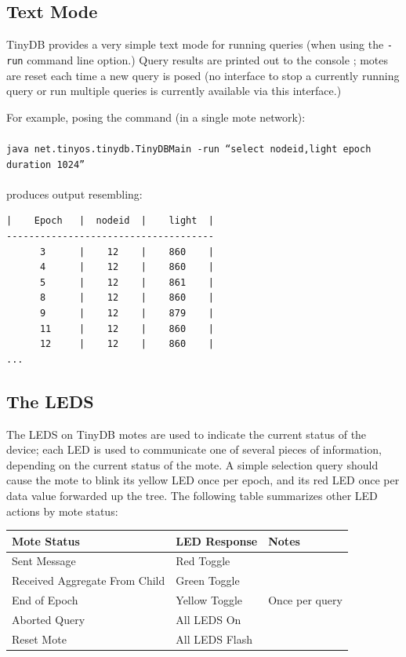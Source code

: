 \documentclass[11pt]{article}
\begin{document}
\subsection{Text Mode}\label{sec:textmode}

TinyDB provides a very simple text mode  for running queries (when using the {\tt -run} command line option.)
Query results are printed out to the console ;  motes are reset each time a new query is posed (no interface
to stop a currently running query or run multiple queries is currently available via this interface.)

\noindent For example, posing the command (in a single mote network):
\\
\\
{\tt java net.tinyos.tinydb.TinyDBMain -run ``select nodeid,light epoch duration 1024''}\\
\\
produces output resembling:
\\
\noindent
\begin{verbatim}
|    Epoch   |  nodeid  |    light  |
-------------------------------------
      3      |    12    |    860    |
      4      |    12    |    860    |
      5      |    12    |    861    |
      8      |    12    |    860    |
      9      |    12    |    879    |
      11     |    12    |    860    |
      12     |    12    |    860    |
...

\end{verbatim}

\subsection{The LEDS}

The LEDS on TinyDB motes are used to indicate the current status of the device;  each LED is used
to communicate one of several pieces of information, depending on the current status of the
mote.  A simple selection query should cause the mote to blink its yellow LED once per epoch, and its
red LED once per data value forwarded up the tree. The following table summarizes other
LED actions by mote status:

\vspace{.1in}
\tiny
\noindent
\begin{tabular}{|l|l|l|}
\hline
Mote Status & LED Response & Notes \\
\hline\hline
Sent Message & Red Toggle & \\
Received Aggregate From Child & Green Toggle & \\
End of Epoch & Yellow Toggle & Once per query \\
Aborted Query & All LEDS On & \\
Reset Mote & All LEDS Flash & \\
\hline
\end{tabular}
\normalsize
\\
\end{document}
